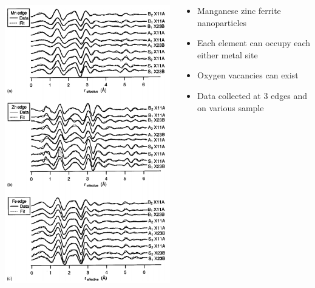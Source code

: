 \documentclass[10pt, xcolor=x11names, compress]{beamer}
\begin{document}
\begin{frame}
\begin{columns}[T]
\begin{column}{0.3\linewidth}
      \includegraphics[width=\linewidth]{images/ferrite_fits.png}
    \end{column}
    \begin{column}{0.5\linewidth}
      \begin{itemize}
      \item Manganese zinc ferrite nanoparticles
      \item Each element can occupy each either metal site
      \item Oxygen vacancies can exist
      \item Data collected at 3 edges and on various sample

\end{itemize}
\end{column}
\end{columns}
\end{frame}
\end{document}
